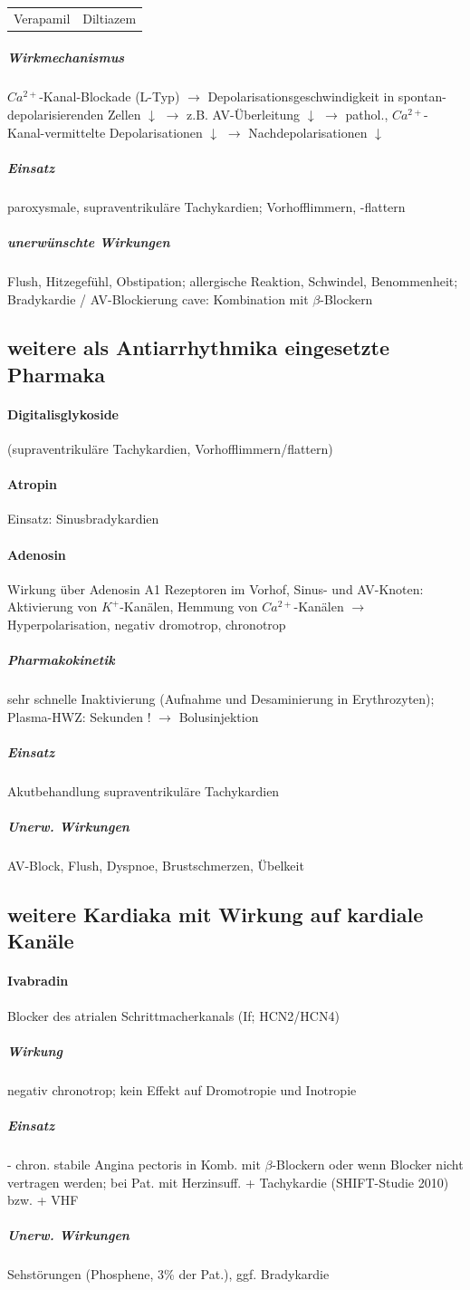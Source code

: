 \documentclass[10pt,a4paper]{report}
\begin{document}
\begin{tabularx}{\textwidth}{XX}
Verapamil&Diltiazem\\
\end{tabularx}

\subparagraph{Wirkmechanismus} $Ca^{2+}$-Kanal-Blockade (L-Typ) $\rightarrow$ Depolarisationsgeschwindigkeit in spontan-depolarisierenden Zellen $\downarrow$ $\rightarrow$ z.B. AV-Überleitung $\downarrow$ $\rightarrow$ pathol., $Ca^{2+}$-Kanal-vermittelte Depolarisationen $\downarrow$ $\rightarrow$ Nachdepolarisationen $\downarrow$ 

\subparagraph{Einsatz}  paroxysmale, supraventrikuläre Tachykardien; Vorhofflimmern, -flattern

\subparagraph{unerwünschte Wirkungen}Flush, Hitzegefühl, Obstipation; allergische Reaktion, Schwindel, Benommenheit; Bradykardie / AV-Blockierung cave: Kombination mit $\beta$-Blockern

\subsection{weitere als Antiarrhythmika eingesetzte Pharmaka}
\paragraph{Digitalisglykoside}  (supraventrikuläre Tachykardien, Vorhofflimmern/flattern)
\paragraph{Atropin}  Einsatz: Sinusbradykardien
\paragraph{Adenosin}  Wirkung über Adenosin A1 Rezeptoren im Vorhof, Sinus- und AV-Knoten: Aktivierung von $K^+$-Kanälen, Hemmung von $Ca^{2+}$-Kanälen $\rightarrow$ Hyperpolarisation, negativ dromotrop, chronotrop
\subparagraph{Pharmakokinetik} sehr schnelle Inaktivierung (Aufnahme und Desaminierung in Erythrozyten); Plasma-HWZ: Sekunden ! $\rightarrow$ Bolusinjektion
\subparagraph{Einsatz} Akutbehandlung supraventrikuläre Tachykardien
\subparagraph{Unerw. Wirkungen} AV-Block, Flush, Dyspnoe, Brustschmerzen, Übelkeit

\subsection{weitere Kardiaka mit Wirkung auf kardiale Kanäle}
\paragraph{Ivabradin} Blocker des atrialen Schrittmacherkanals (If; HCN2/HCN4)
\subparagraph{Wirkung} negativ chronotrop; kein Effekt auf Dromotropie und Inotropie
\subparagraph{Einsatz}  - chron. stabile Angina pectoris in Komb. mit $\beta$-Blockern oder wenn Blocker nicht vertragen werden; bei Pat. mit Herzinsuff. + Tachykardie (SHIFT-Studie 2010) bzw. + VHF
\subparagraph{Unerw. Wirkungen} Sehstörungen (Phosphene, 3\% der Pat.), ggf. Bradykardie
\end{document}
